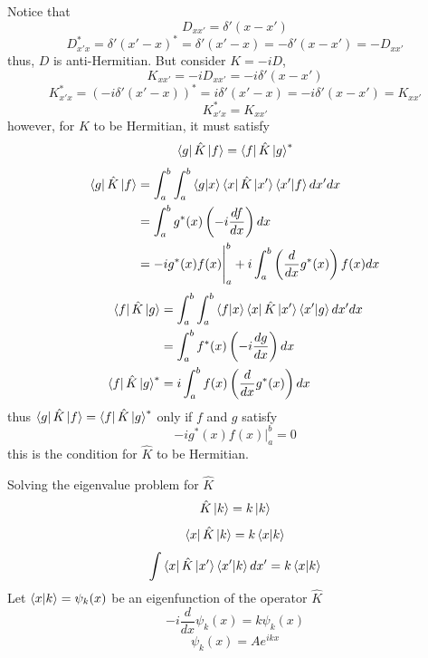 \documentclass[12pt,a4paper]{report}
\newcommand{\der}[2]{\frac{d#1}{d#2}}
\begin{document}
Notice that
\begin{equation*}
    D_{xx'} = \delta'(x-x')
\end{equation*}
\begin{equation*}
    D_{x'x}^* = \delta'(x'-x)^* = \delta'(x'-x) = -\delta'(x-x') = -D_{xx'}
\end{equation*}
thus, $D$ is anti-Hermitian. But consider $K = -iD$,
\begin{equation*}
    K_{xx'} = -iD_{xx'} = -i\delta'(x-x')
\end{equation*}
\begin{equation*}
    K_{x'x}^* = (-i\delta'(x'-x))^* = i\delta'(x'-x) = -i\delta'(x-x') = K_{xx'}
\end{equation*}
\begin{equation*}
    K_{x'x}^* = K_{xx'}
\end{equation*}
however, for $K$ to be Hermitian, it must satisfy
\begin{equation*}
    \bra{g}\hat{K}\ket{f} = \bra{f}\hat{K}\ket{g}^*
\end{equation*}
\begin{align*}
    \bra{g}\hat{K}\ket{f} &= \int_{a}^{b} \int_{a}^{b} \bra{g}\ket{x}\bra{x}\hat{K}\ket{x'}\bra{x'}\ket{f} dx' dx \\
    &= \int_{a}^{b} g^*(x) \left( -i \der{f}{x} \right) dx \\
    &= -ig^*(x)f(x)\Biggr |_{a}^{b} + i\int_{a}^{b}\left( \der{}{x} g^*(x) \right) f(x) dx
\end{align*}
\begin{align*}
    \bra{f}\hat{K}\ket{g} &= \int_{a}^{b} \int_{a}^{b} \bra{f}\ket{x}\bra{x}\hat{K}\ket{x'}\bra{x'}\ket{g} dx' dx \\
    &= \int_{a}^{b} f^*(x) \left( -i \der{g}{x} \right) dx \\
    \bra{f}\hat{K}\ket{g}^* &= i\int_{a}^{b} f(x) \left( \der{}{x} g^*(x) \right) dx
\end{align*}
thus $\bra{g}\hat{K}\ket{f} = \bra{f}\hat{K}\ket{g}^*$ only if $f$ and $g$ satisfy
\begin{equation*}
    -ig^*(x)f(x)\Biggr |_{a}^{b} = 0
\end{equation*}
this is the condition for $\hat{K}$ to be Hermitian.

Solving the eigenvalue problem for $\hat{K}$
\begin{equation*}
    \hat{K}\ket{k} = k\ket{k}
\end{equation*}
\begin{equation*}
    \bra{x}\hat{K}\ket{k} = k\bra{x}\ket{k}
\end{equation*}
\begin{equation*}
    \int \bra{x}\hat{K}\ket{x'}\bra{x'}\ket{k} dx' = k\bra{x}\ket{k}
\end{equation*}
Let $\bra{x}\ket{k} = \psi_k(x)$ be an eigenfunction of the operator $\hat{K}$
\begin{equation*}
    -i\der{}{x} \psi_k(x) = k\psi_k(x)
\end{equation*}
\begin{equation*}
    \psi_k(x) = Ae^{ikx}
\end{equation*}
\end{document}
